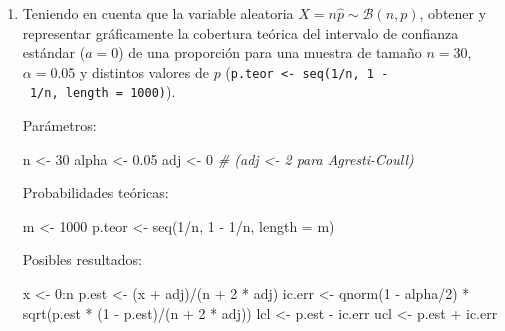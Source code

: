 \documentclass[
]{book}
\newenvironment{Shaded}{\begin{snugshade}}{\end{snugshade}}
\newcommand{\AttributeTok}[1]{\textcolor[rgb]{0.77,0.63,0.00}{#1}}
\newcommand{\CommentTok}[1]{\textcolor[rgb]{0.56,0.35,0.01}{\textit{#1}}}
\newcommand{\DecValTok}[1]{\textcolor[rgb]{0.00,0.00,0.81}{#1}}
\newcommand{\FloatTok}[1]{\textcolor[rgb]{0.00,0.00,0.81}{#1}}
\newcommand{\FunctionTok}[1]{\textcolor[rgb]{0.00,0.00,0.00}{#1}}
\newcommand{\NormalTok}[1]{#1}
\newcommand{\OtherTok}[1]{\textcolor[rgb]{0.56,0.35,0.01}{#1}}
\newcommand{\SpecialCharTok}[1]{\textcolor[rgb]{0.00,0.00,0.00}{#1}}
\theoremstyle{break}
\theoremstyle{definition}
\theoremstyle{definition}
\theoremstyle{definition}
\theoremstyle{definition}
\theoremstyle{remark}
\begin{document}
\begin{enumerate}
\def\labelenumi{\alph{enumi})}
\item
  Teniendo en cuenta que la variable aleatoria \(X=n\hat{p}\sim\mathcal{B}(n,p)\),
  obtener y representar gráficamente la cobertura teórica del
  intervalo de confianza estándar (\(a=0\)) de una proporción para
  una muestra de tamaño \(n=30\), \(\alpha=0.05\) y distintos valores
  de \(p\) (\texttt{p.teor\ \textless{}-\ seq(1/n,\ 1\ -\ 1/n,\ length\ =\ 1000)}).

  Parámetros:

\begin{Shaded}
\begin{Highlighting}[]
\NormalTok{n }\OtherTok{\textless{}{-}} \DecValTok{30}
\NormalTok{alpha }\OtherTok{\textless{}{-}} \FloatTok{0.05}
\NormalTok{adj }\OtherTok{\textless{}{-}} \DecValTok{0}  \CommentTok{\# (adj \textless{}{-} 2 para Agresti{-}Coull)}
\end{Highlighting}
\end{Shaded}

  Probabilidades teóricas:

\begin{Shaded}
\begin{Highlighting}[]
\NormalTok{m }\OtherTok{\textless{}{-}} \DecValTok{1000}
\NormalTok{p.teor }\OtherTok{\textless{}{-}} \FunctionTok{seq}\NormalTok{(}\DecValTok{1}\SpecialCharTok{/}\NormalTok{n, }\DecValTok{1} \SpecialCharTok{{-}} \DecValTok{1}\SpecialCharTok{/}\NormalTok{n, }\AttributeTok{length =}\NormalTok{ m) }
\end{Highlighting}
\end{Shaded}

  Posibles resultados:

\begin{Shaded}
\begin{Highlighting}[]
\NormalTok{x }\OtherTok{\textless{}{-}} \DecValTok{0}\SpecialCharTok{:}\NormalTok{n}
\NormalTok{p.est }\OtherTok{\textless{}{-}}\NormalTok{ (x }\SpecialCharTok{+}\NormalTok{ adj)}\SpecialCharTok{/}\NormalTok{(n }\SpecialCharTok{+} \DecValTok{2} \SpecialCharTok{*}\NormalTok{ adj) }
\NormalTok{ic.err }\OtherTok{\textless{}{-}} \FunctionTok{qnorm}\NormalTok{(}\DecValTok{1} \SpecialCharTok{{-}}\NormalTok{ alpha}\SpecialCharTok{/}\DecValTok{2}\NormalTok{) }\SpecialCharTok{*} \FunctionTok{sqrt}\NormalTok{(p.est }\SpecialCharTok{*}\NormalTok{ (}\DecValTok{1} \SpecialCharTok{{-}}\NormalTok{ p.est)}\SpecialCharTok{/}\NormalTok{(n }\SpecialCharTok{+} \DecValTok{2} \SpecialCharTok{*}\NormalTok{ adj))  }
\NormalTok{lcl }\OtherTok{\textless{}{-}}\NormalTok{ p.est }\SpecialCharTok{{-}}\NormalTok{ ic.err }
\NormalTok{ucl }\OtherTok{\textless{}{-}}\NormalTok{ p.est }\SpecialCharTok{+}\NormalTok{ ic.err }
\end{Highlighting}
\end{Shaded}


\end{enumerate}
\end{document}
